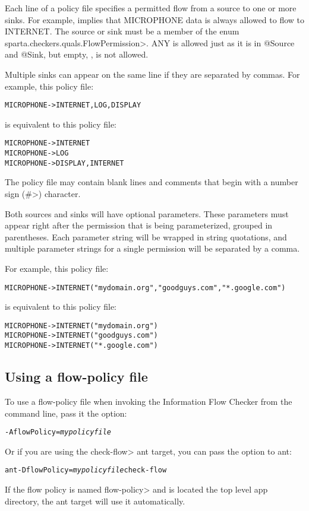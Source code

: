 Each line of a policy file specifies a permitted flow from a source to one
or more sinks.  For example,
 implies that
MICROPHONE data is always allowed to flow to INTERNET.
The source or sink must be a member of the enum
\<sparta.checkers.quals.FlowPermission>.  
ANY is allowed just as it is in @Source and @Sink, but empty, \ttcbs, is not allowed.

Multiple sinks can appear on the same line if they are separated by commas. 
For example, this policy file:
\begin{alltt}
   MICROPHONE -> INTERNET, LOG, DISPLAY
\end{alltt}
is equivalent to this policy file:
\begin{alltt}
   MICROPHONE -> INTERNET
   MICROPHONE -> LOG
   MICROPHONE -> DISPLAY, INTERNET
\end{alltt}

The policy file may contain blank lines and comments that begin with 
a number sign (\<\#>) character. \newline

\noindent
Both sources and sinks will have optional parameters. These parameters must appear
right after the permission that is being parameterized, grouped in parentheses. 
Each parameter string will be wrapped in string quotations, and multiple parameter
strings for a single permission will be separated by a comma.\newline

\noindent
For example, this policy file:
\begin{alltt}
   MICROPHONE -> INTERNET("mydomain.org", "goodguys.com", "*.google.com")
\end{alltt}
is equivalent to this policy file:
\begin{alltt}
   MICROPHONE -> INTERNET("mydomain.org")
   MICROPHONE -> INTERNET("goodguys.com")
   MICROPHONE -> INTERNET("*.google.com")
\end{alltt}


\subsection{Using a flow-policy file}
To use a flow-policy file when invoking the Information Flow Checker from the
command line, pass it the option:
\begin{alltt}
-AflowPolicy=\emph{mypolicyfile}
\end{alltt}

Or if you are using the \<check-flow> ant target, you can pass the option to ant:
\begin{alltt}
ant -DflowPolicy=\emph{mypolicyfile} check-flow
\end{alltt}
If the flow policy is named \<flow-policy> and is located the top level app directory, the ant 
target will use it automatically.


